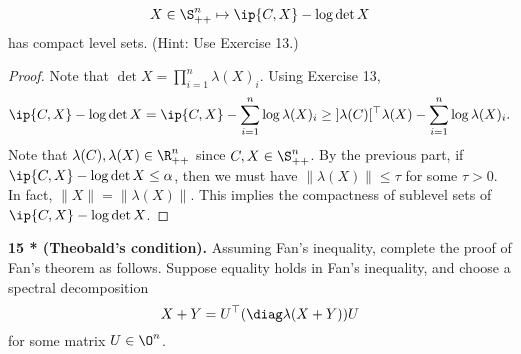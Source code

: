\documentclass[../borwein-lewis_notes.tex]{subfiles}
\begin{document}
\begin{enumerate}[(a)]
\begin{equation*}
X\in\S_{++}^n\mapsto \ip{C,X}-\log\det X
\end{equation*}
has compact level sets. (Hint: Use Exercise 13.)
\begin{proof}
Note that $\det X = \prod_{i=1}^n \lambda(X)_i$. Using Exercise 13,
\begin{equation*}
\ip{C,X} - \log\det X = \ip{C,X}-\sum_{i=1}^n \log \lambda(X)_i
\geq\; ]\lambda(C)[^\top\lambda(X) - \sum_{i=1}^n\log\lambda(X)_i.
\end{equation*}
Note that $\lambda(C),\lambda(X)\in\R_{++}^n$ since $C,X\in\S_{++}^n$.
By the previous part, if $\ip{C,X}-\log\det X \leq \alpha$, then 
we must have $\|\lambda(X)\|\leq\tau$ for some $\tau>0$. In 
fact, $\|X\|=\|\lambda(X)\|$. This implies the compactness of sublevel
sets of $\ip{C,X}-\log\det X$.
\end{proof}
\end{enumerate}
\noindent \textbf{15 * (Theobald's condition).} Assuming Fan's inequality,
complete the proof of Fan's theorem as follows. Suppose equality holds in 
Fan's inequality, and choose a spectral decomposition 
\begin{equation*}
X+Y = U^\top (\diag \lambda(X+Y)) U
\end{equation*}
for some matrix $U\in\O^n$.
\end{document}
